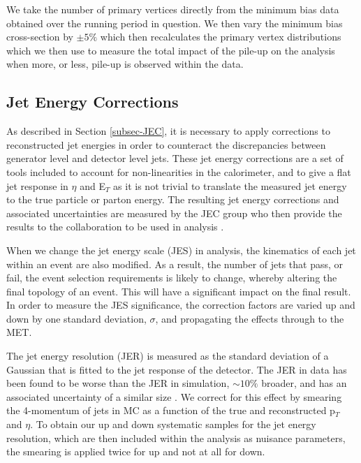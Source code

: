 We take the number of primary vertices directly from the minimum bias data obtained over the running period in question. We then vary the minimum bias cross-section by $\pm5\%$ which then recalculates the primary vertex distributions which we then use to measure the total impact of the pile-up on the analysis when more, or less, pile-up is observed within the data. %


\subsection{Jet Energy Corrections} \label{subsec-JECUncertainty}

As described in Section \ref{subsec-JEC}, it is necessary to apply corrections to reconstructed jet energies in order to counteract the discrepancies between generator level and detector level jets. These jet energy corrections are a set of tools included to account for non-linearities in the calorimeter, and to give a flat jet response in $\eta$ and E$_T$ as it is not trivial to translate the measured jet energy to the true particle or parton energy. The resulting jet energy corrections and associated uncertainties are measured by the JEC group who then provide the results to the collaboration to be used in analysis \cite{1748-0221-6-11-P11002, CMS-DP-2013-033}.

When we change the jet energy scale (JES) in analysis, the kinematics of each jet within an event are also modified. As a result, the number of jets that pass, or fail, the event selection requirements is likely to change, whereby altering the final topology of an event. This will have a significant impact on the final result. In order to measure the JES significance, the correction factors are varied up and down by one standard deviation, $\sigma$, and propagating the effects through to the MET. %

The jet energy resolution (JER) is measured as the standard deviation of a Gaussian that is fitted to the jet response of the detector. The JER in data has been found to be worse than the JER in simulation, $\sim 10\%$ broader, and has an associated uncertainty of a similar size \cite{CMS:2011esa}. We correct for this effect by smearing the 4-momentum of jets in MC as a function of the true and reconstructed p$_T$ and $\eta$. To obtain our up and down systematic samples for the jet energy resolution, which are then included within the analysis as nuisance parameters, the smearing is applied twice for up and not at all for down. %

